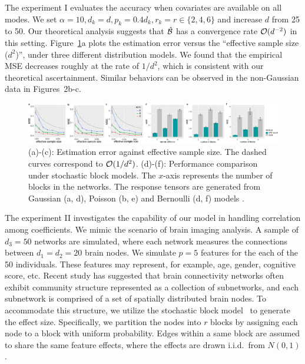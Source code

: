 \documentclass{article}
\theoremstyle{definition}
\theoremstyle{definition}
\begin{document}
The experiment I evaluates the accuracy when covariates are available on all modes. We set $\alpha=10, d_k=d, p_k=0.4d_k, r_k=r\in\{2,4,6\}$ and increase $d$ from 25 to 50. Our theoretical analysis suggests that $\hat {\mathcal{B}}$ has a convergence rate $\mathcal{O}(d^{-2})$ in this setting. Figure~\ref{fig:dim}a plots the estimation error versus the ``effective sample size ($d^2$)'', under three different distribution models. We found that the empirical MSE decreases roughly at the rate of $1/d^2$, which is consistent with our theoretical ascertainment. 
Similar behaviors can be observed in the non-Gaussian data in Figures~2b-c. 

\begin{figure}[!h]
\centering
\includegraphics[width=14cm]{dim_alternative_w.pdf}
\vspace{-.5cm}
\caption{(a)-(c): Estimation error against effective sample size. The dashed curves correspond to $\mathcal{O}({1/d^2})$. (d)-(f): Performance comparison under stochastic block models. The $x$-axis represents the number of blocks in the networks. The response tensors are generated from Gaussian (a, d), Poisson (b, e) and  Bernoulli  (d, f) models . }\label{fig:dim}
\end{figure}

The experiment II investigates the capability of our model in handling correlation among coefficients. We mimic the scenario of brain imaging analysis. A sample of $d_3=50$ networks are simulated, where each network measures the connections between $d_1=d_2=20$ brain nodes. We simulate $p=5$ features for the each of the 50 individuals. These features may represent, for example, age, gender, cognitive score, etc. Recent study has suggested that brain connectivity networks often exhibit community structure represented as a collection of subnetworks, and each subnetwork is comprised of a set of spatially distributed brain nodes. To accommodate this structure, we utilize the stochastic block model~\citep{abbe2017community} to generate the effect size. Specifically, we partition the nodes into $r$ blocks by assigning each node to a block with uniform probability. Edges within a same block are assumed to share the same feature effects, where the effects are drawn i.i.d.\ from $N(0,1)$. 
\end{document}
